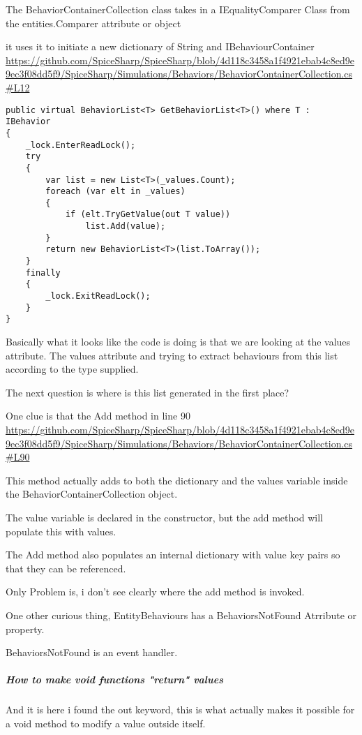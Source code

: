 \documentclass[12pt]{article}
\renewcommand{\_}{\kern-1.5pt\textunderscore\kern-1.5pt}
\begin{document}
The BehaviorContainerCollection class takes in a IEqualityComparer Class from the 
entities.Comparer attribute or object

it uses it to initiate a new dictionary of String and IBehaviourContainer
\url{https://github.com/SpiceSharp/SpiceSharp/blob/4d118c3458a1f4921ebab4c8ed9e9ec3f08dd5f9/SpiceSharp/Simulations/Behaviors/BehaviorContainerCollection.cs#L12}

\begin{verbatim}
public virtual BehaviorList<T> GetBehaviorList<T>() where T : IBehavior
{
	_lock.EnterReadLock();
	try
	{
		var list = new List<T>(_values.Count);
		foreach (var elt in _values)
		{
			if (elt.TryGetValue(out T value))
				list.Add(value);
		}
		return new BehaviorList<T>(list.ToArray());
	}
	finally
	{
		_lock.ExitReadLock();
	}
}
\end{verbatim}


Basically what it looks like the code is doing is that we are looking at the \_values attribute.
The \_values attribute and trying to extract behaviours from this list according to the 
type supplied.

The next question is where is this list generated in the first place?

One clue is that the Add method in line 90
\url{https://github.com/SpiceSharp/SpiceSharp/blob/4d118c3458a1f4921ebab4c8ed9e9ec3f08dd5f9/SpiceSharp/Simulations/Behaviors/BehaviorContainerCollection.cs#L90}

This method actually adds to both the dictionary and the \_values variable inside the BehaviorContainerCollection object.

The \_value variable is declared in the constructor, but the add method will populate this with values.

The Add method also  populates an internal dictionary with value key pairs so that they can be referenced.

Only Problem is, i don't see clearly where the add method is invoked.

One other curious thing, EntityBehaviours has a BehaviorsNotFound Atrribute or property.

BehaviorsNotFound is an event handler. 

\subparagraph[Void functions can return change values of referenced variables using the out keyword]{How to make void functions "return" values}
And it is here i found the out keyword, this is what actually makes it possible
for a void method to modify a value outside itself.
\end{document}
